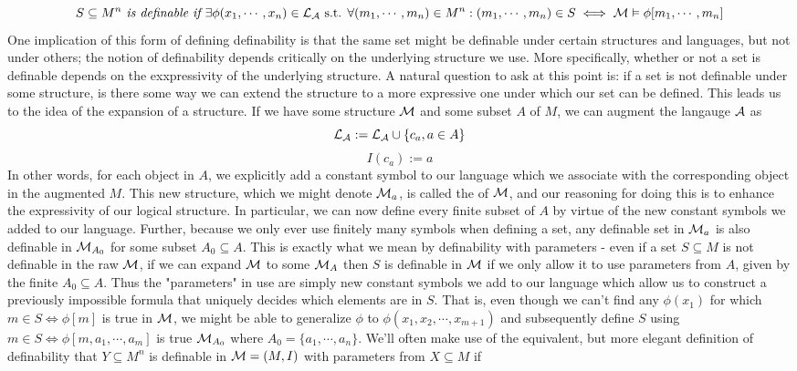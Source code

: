 \documentclass{article}
\begin{document}
    $$ S \subseteq M^n \textit{ is definable if } \exists \phi(x_1, \cdots, x_n) \in \mathcal{L}_{\mathcal{A}} \textnormal{ s.t. } \forall (m_1, \cdots, m_n) \in M^n: (m_1, \cdots, m_n) \in S \iff \mathcal{M} \vDash \phi[m_1, \cdots, m_n] $$
One implication of this form of defining definability is that the same set might be definable under certain structures and languages, but not under others; the notion of definability depends critically on the underlying structure we use. More specifically, whether or not a set is definable depends on the exxpressivity of the underlying structure. A natural question to ask at this point is: if a set is not definable under some structure, is there some way we can extend the structure to a more expressive one under which our set can be defined. This leads us to the idea of the expansion of a structure. If we have some structure $ \mathcal{M} $ and some subset $ A $ of $ M $, we can augment the langauge $ \mathcal{A} $ as
    $$ \mathcal{L}_{\mathcal{A}} := \mathcal{L}_{\mathcal{A}} \cup \{ c_a, a \in A \} $$
    $$ I(c_a) := a $$
In other words, for each object in $ A $, we explicitly add a constant symbol to our language which we associate with the corresponding object in the augmented $ M $. This new structure, which we might denote $ \mathcal{M}_a $, is called the  of $ \mathcal{M} $, and our reasoning for doing this is to enhance the expressivity of our logical structure. In particular, we can now define every finite subset of $ A $ by virtue of the new constant symbols we added to our language. Further, because we only ever use finitely many symbols when defining a set, any definable set in $ \mathcal{M}_a $ is also definable in $ \mathcal{M}_{A_0} $ for some subset $ A_0 \subseteq A $. This is exactly what we mean by definability with parameters - even if a set $ S \subseteq M $ is not definable in the raw $ \mathcal{M} $, if we can expand $ \mathcal{M} $ to some $ \mathcal{M}_A $ then $ S $ is definable in $ \mathcal{M} $ if we only allow it to use parameters from $ A $, given by the finite $ A_0 \subseteq A $. Thus the "parameters" in use are simply new constant symbols we add to our language which allow us to construct a previously impossible formula that uniquely decides which elements are in $ S $. That is, even though we can't find any $ \phi(x_1) $ for which $ m \in S \iff \phi[m] $ is true in $ \mathcal{M} $, we might be able to generalize $ \phi $ to $ \phi(x_1, x_2, \cdots, x_{m + 1}) $ and subsequently define $ S $ using $ m \in S \iff \phi[m, a_1, \cdots, a_m] $ is true $ \mathcal{M}_{A_0} $ where $ A_0 = \{ a_1, \cdots, a_n \} $.
\nn
We'll often make use of the equivalent, but more elegant definition of definability that $ Y \subseteq M^n $ is definable in $ \mathcal{M} = (M, I) $ with parameters from $ X \subseteq M $ if
\end{document}
